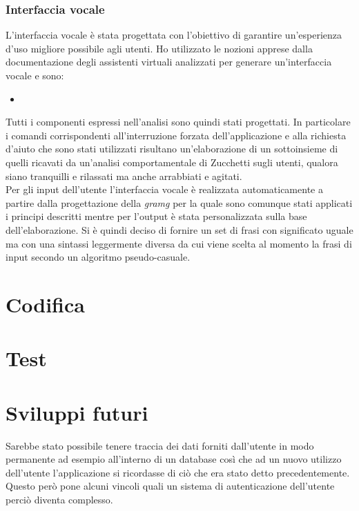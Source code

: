 		\subsubsection{Interfaccia vocale}
		L'interfaccia vocale è stata progettata con l'obiettivo di garantire un'esperienza d'uso migliore possibile agli utenti. Ho utilizzato le nozioni apprese dalla documentazione degli assistenti virtuali analizzati per generare un'interfaccia vocale e sono:
		\begin{itemize}
			\item %
		\end{itemize}		
		Tutti i componenti espressi nell'analisi sono quindi stati progettati. In particolare i comandi corrispondenti all'interruzione forzata dell'applicazione e alla richiesta d'aiuto che sono stati utilizzati risultano un'elaborazione di un sottoinsieme di quelli ricavati da un'analisi comportamentale di Zucchetti sugli utenti, qualora siano tranquilli e rilassati ma anche arrabbiati e agitati. \\
		Per gli input dell'utente l'interfaccia vocale è realizzata automaticamente a partire dalla progettazione della \emph{\gls{gramg}} per la quale sono comunque stati applicati i principi descritti mentre per l'output è stata personalizzata sulla base dell'elaborazione. Si è quindi deciso di fornire un set di frasi con significato uguale ma con una sintassi leggermente diversa da cui viene scelta al momento la frasi di input secondo un algoritmo pseudo-casuale.
\section{Codifica}

\section{Test}

\section{Sviluppi futuri}
Sarebbe stato possibile tenere traccia dei dati forniti dall'utente in modo permanente ad esempio all'interno di un database così che ad un nuovo utilizzo dell'utente l'applicazione si ricordasse di ciò che era stato detto precedentemente. Questo però pone alcuni vincoli quali un sistema di autenticazione dell'utente perciò diventa complesso.